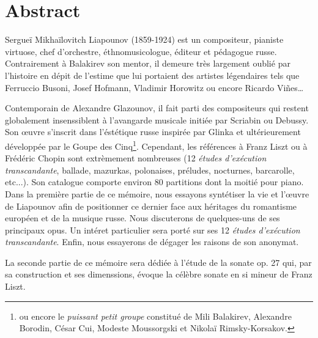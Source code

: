 
\chapter*{Abstract}

Sergueï Mikhaïlovitch Liapounov (1859-1924) est un compositeur, pianiste virtuose,
chef d'orchestre, éthnomusicologue, éditeur et pédagogue russe. Contrairement à
Balakirev son mentor, il demeure très largement oublié par l'histoire en dépit
de l'estime que lui portaient des artistes légendaires tels que Ferruccio Busoni,
Josef Hofmann, Vladimir Horowitz ou encore Ricardo Vi\~{n}es\dots

Contemporain de Alexandre Glazounov, il fait parti des compositeurs qui restent
globalement insenssiblent à l'avangarde musicale initiée par Scriabin ou Debussy.
Son œuvre s'inscrit dans l'éstétique russe inspirée par Glinka et ultérieurement
développée par le Goupe des Cinq\footnote{ou encore le \emph{puissant petit groupe}
constitué de Mili Balakirev, Alexandre Borodin, César Cui, Modeste Moussorgski
et Nikolaï Rimsky-Korsakov.}. Cependant, les références à Franz Liszt ou à Frédéric
Chopin sont extrèmement nombreuses (12 \emph{études d'exécution transcandante},
ballade, mazurkas, polonaises, préludes, nocturnes, barcarolle, etc...). Son
catalogue comporte environ 80 partitions dont la moitié pour piano.\\

Dans la première partie de ce mémoire, nous essayons syntétiser la vie et
l'œuvre de Liapounov afin de positionner ce dernier face aux héritages du
romantisme européen et de la musique russe. Nous discuterons de quelques-uns
de ses principaux opus. Un intéret particulier sera porté sur ses 12
\emph{études d'exécution transcandante}. Enfin, nous essayerons de dégager les
raisons de son anonymat.

La seconde partie de ce mémoire sera dédiée à l'étude de la sonate op. 27 qui,
par sa construction et ses dimenssions, évoque la célèbre sonate en si mineur
de Franz Liszt.


